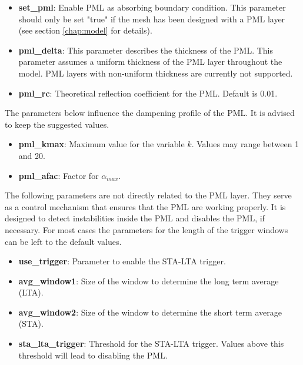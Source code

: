     	\begin{itemize}
    	 	\item \textbf{set\_pml}: Enable PML as absorbing boundary condition. This parameter should only be set "true" if the mesh has been designed with a PML layer (see section \ref{chap:model} for details).
    	 	\item \textbf{pml\_delta}: This parameter describes the thickness of the PML. This parameter assumes a uniform thickness of the PML layer throughout the model. PML layers with non-uniform thickness are currently not supported.
    	 	\item \textbf{pml\_rc}: Theoretical reflection coefficient for the PML. Default is 0.01.
    	 	
    	\end{itemize}
			The parameters below influence the dampening profile of the PML. It is advised to keep the suggested values.
			
			\begin{itemize}
				\item \textbf{pml\_kmax}: Maximum value for the variable $k$. Values may range between 1 and 20.
				\item \textbf{pml\_afac}: Factor for $\alpha_{max}$.
			\end{itemize}
			
			The following parameters are not directly related to the PML layer. They serve as a control mechanism that ensures that the PML are working properly. It is designed to detect instabilities inside the PML and disables the PML, if necessary. For most cases the parameters for the length of the trigger windows can be left to the default values.
			
			\begin{itemize}
				\item \textbf{use\_trigger}: Parameter to enable the STA-LTA trigger. 
				\item \textbf{avg\_window1}: Size of the window to determine the long term average (LTA).
				\item \textbf{avg\_window2}: Size of the window to determine the short term average (STA).
				\item \textbf{sta\_lta\_trigger}: Threshold for the STA-LTA trigger. Values above this threshold will lead to disabling the PML.
			\end{itemize}
			
